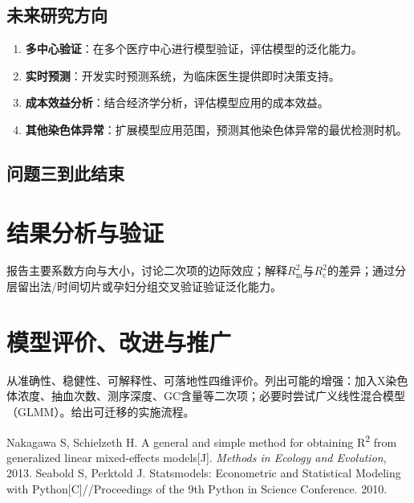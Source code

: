\documentclass[12pt,a4paper]{ctexart}
\numberwithin{equation}{section}
\theoremstyle{mcm}
\begin{document}
\subsection{未来研究方向}

\begin{enumerate}
\item \textbf{多中心验证}：在多个医疗中心进行模型验证，评估模型的泛化能力。

\item \textbf{实时预测}：开发实时预测系统，为临床医生提供即时决策支持。

\item \textbf{成本效益分析}：结合经济学分析，评估模型应用的成本效益。

\item \textbf{其他染色体异常}：扩展模型应用范围，预测其他染色体异常的最优检测时机。
\end{enumerate}
\subsection{问题三到此结束}

\section{结果分析与验证}
报告主要系数方向与大小，讨论二次项的边际效应；解释$R^2_\text{m}$与$R^2_\text{c}$的差异；通过分层留出法/时间切片或孕妇分组交叉验证验证泛化能力。

\section{模型评价、改进与推广}
从准确性、稳健性、可解释性、可落地性四维评价。列出可能的增强：加入X染色体浓度、抽血次数、测序深度、GC含量等二次项；必要时尝试广义线性混合模型（GLMM）。给出可迁移的实施流程。

\begin{thebibliography}{99}\setlength{\itemsep}{0.4em}
 Nakagawa S, Schielzeth H. A general and simple method for obtaining R\textsuperscript{2} from generalized linear mixed-effects models[J]. \emph{Methods in Ecology and Evolution}, 2013.
 Seabold S, Perktold J. Statsmodels: Econometric and Statistical Modeling with Python[C]//Proceedings of the 9th Python in Science Conference. 2010.
\end{thebibliography}
\end{document}
